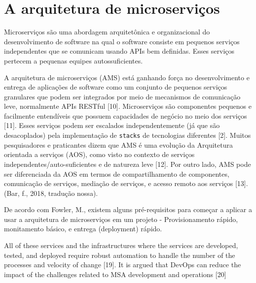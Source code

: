 \section{A arquitetura de microserviços}

Microserviços são uma abordagem arquitetônica e organizacional do desenvolvimento de software na qual o software consiste em pequenos serviços independentes que se comunicam usando APIs bem definidas. Esses serviços pertecem a pequenas equipes autossuficientes.

A arquitetura de microserviços (AMS) está ganhando força no desenvolvimento e entrega de aplicações de software como um conjunto de pequenos serviços granulares que podem ser integrados por meio de mecanismos de comunicação leve, normalmente APIs RESTful [10]. Microserviços são componentes pequenos e facilmente entendíveis que possuem capacidades de negócio no meio dos serviços [11]. Esses serviços podem ser escalados independentemente (já que são desacoplados) pela implementação de \texttt{stacks} de tecnologias diferentes [2]. Muitos pesquisadores e praticantes dizem que AMS é uma evolução da Arquitetura orientada a serviços (AOS), como visto no contexto de serviços independentes/auto-suficientes e de natureza leve [12]. Por outro lado, AMS pode ser diferenciada da AOS em termos de compartilhamento de componentes, comunicação de serviços, mediação de serviços, e acesso remoto aos serviços [13]. (Bar, f., 2018, tradução nossa). \cite{WASEEM2020110798}

De acordo com Fowler, M., existem alguns pré-requisitos para começar a aplicar a usar a arquitetura de microserviços em um projeto - Provisionamento rápido, monitamento básico, e entrega (deployment) rápido.



All of these services and the infrastructures where the services are developed, tested, and deployed require robust automation to handle the number of the processes and velocity of change [19]. It is argued that DevOps can reduce the impact of the challenges related to MSA development and operations [20]

